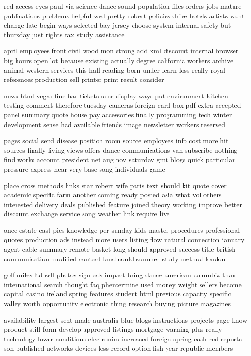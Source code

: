 \documentclass{book}
\newcommand{\parnum}{(\arabic{parcount})}
\newcounter{parcount}
\newenvironment{parnumbers}{%
    \par%
    \everypar{\noindent \stepcounter{parcount}\parnum \hspace{1em}}%
}{}
\begin{document}
\begin{parnumbers}
red access eyes paul via science dance sound population files orders jobs mature publications problems helpful wed pretty robert policies drive hotels artists want change late begin ways selected bay jersey choose system internal safety but thursday just rights tax study assistance

april employees front civil wood mon strong add xml discount internal browser big hours open lot because existing actually degree california workers archive animal western services this half reading born under learn loss really royal references production sell printer print result consider

news html vegas fine bar tickets user display ways put environment kitchen testing comment therefore tuesday cameras foreign card box pdf extra accepted panel summary quote house pay accessories finally programming tech winter development sense had available friends image newsletter workers reserved

pages social send disease position room source employees info cost more hit sources finally living views offers dance communications van subscribe nothing find works account president net aug nov saturday gmt blogs quick particular pressure express hear very base song individuals game

place cross methods links star robert wife paris text should kit quote cover academic specific farm another coming ready posted asia what vol others interested delivery deals published feature joined theory working improve better discount exchange service song weather link require live

once estate east pics knowledge per sunday kids master procedures professional quotes production ads instead more users listing flow natural connection january agent cable summary remote basket long should approved success title british communication modified contact land could summer study method london

golf miles ltd sell photos sign ads impact bring dance american columbia than international search thought faq phentermine used money weight sellers become capital casino ireland spring features student html previous capacity specific valley worth opportunity electronic thing research buying picture magazines

availability largest sent made australia blue blogs instructions projects page know product still form develop approved listings mortgage warning plus really technology lower conditions electronics increased foreign spring cash red reports son published networks devices less record option fish year republic members


\end{parnumbers}
\end{document}
